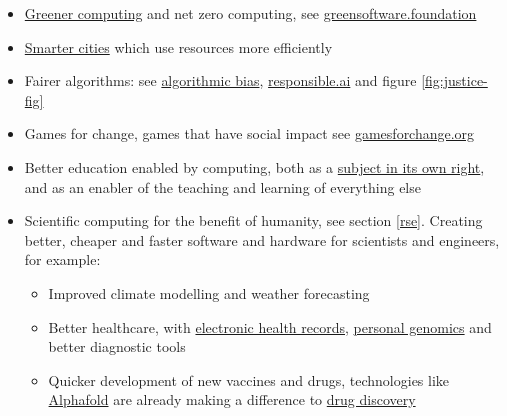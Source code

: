 \documentclass[
]{book}
\providecommand{\tightlist}{%
  \setlength{\itemsep}{0pt}\setlength{\parskip}{0pt}}
\begin{document}
\begin{itemize}
\tightlist
\item
  \href{https://en.wikipedia.org/wiki/Green_computing}{Greener computing} and net zero computing, see \href{https://greensoftware.foundation/}{greensoftware.foundation} \citep{Knowles2022, netzero}
\item
  \href{https://en.wikipedia.org/wiki/Smart_city}{Smarter cities} which use resources more efficiently \citep{smartercities}
\item
  Fairer algorithms: see \href{https://en.wikipedia.org/wiki/Algorithmic_bias}{algorithmic bias}, \href{https://www.responsible.ai/}{responsible.ai} and figure \ref{fig:justice-fig}
\item
  Games for change, games that have social impact see \href{https://www.gamesforchange.org/}{gamesforchange.org}
\item
  Better education enabled by computing, both as a \href{https://en.wikipedia.org/wiki/Computer_science_education}{subject in its own right}, and as an enabler of the teaching and learning of everything else
\item
  Scientific computing for the benefit of humanity, see section \ref{rse}. Creating better, cheaper and faster software and hardware for scientists and engineers, for example:

  \begin{itemize}
  \tightlist
  \item
    Improved climate modelling and weather forecasting
  \item
    Better healthcare, with \href{https://en.wikipedia.org/wiki/Electronic_health_record}{electronic health records}, \href{https://en.wikipedia.org/wiki/Personal_genomics}{personal genomics} and better diagnostic tools
  \item
    Quicker development of new vaccines and drugs, technologies like \href{https://en.wikipedia.org/wiki/AlphaFold}{Alphafold} are already making a difference to \href{https://en.wikipedia.org/wiki/Drug_discovery}{drug discovery} \citep{Jumper2021}
  \end{itemize}
\end{itemize}
\end{document}
